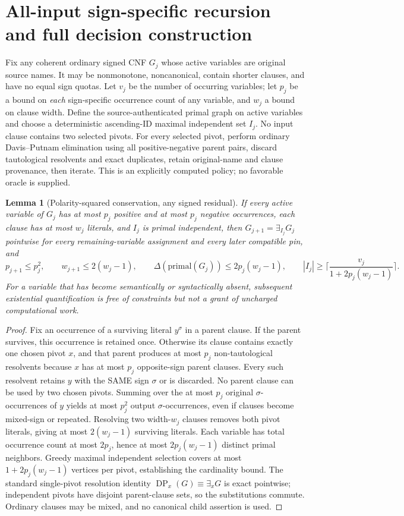 \documentclass[11pt]{article}
\newtheorem{lemma}{Lemma}
\begin{document}
\section{All-input sign-specific recursion and full decision construction}
Fix any coherent ordinary signed CNF $G_j$ whose active variables are original source names. It may be nonmonotone, noncanonical, contain shorter clauses, and have no equal sign quotas. Let $v_j$ be the number of occurring variables; let $p_j$ be a bound on \emph{each} sign-specific occurrence count of any variable, and $w_j$ a bound on clause width. Define the source-authenticated primal graph on active variables and choose a deterministic ascending-ID maximal independent set $I_j$. No input clause contains two selected pivots. For every selected pivot, perform ordinary Davis--Putnam elimination using all positive-negative parent pairs, discard tautological resolvents and exact duplicates, retain original-name and clause provenance, then iterate. This is an explicitly computed policy; no favorable oracle is supplied.

\begin{lemma}[Polarity-squared conservation, any signed residual]
If every active variable of $G_j$ has at most $p_j$ positive and at most $p_j$ negative occurrences, each clause has at most $w_j$ literals, and $I_j$ is primal independent, then $G_{j+1}=\exists_{I_j}G_j$ pointwise for \emph{every} remaining-variable assignment and every later compatible pin, and
\[
 p_{j+1}\le p_j^2,\qquad
 w_{j+1}\le2(w_j-1),\qquad
 \Delta(\mathrm{primal}(G_j))\le2p_j(w_j-1),\qquad
 |I_j|\ge\Big\lceil\frac{v_j}{1+2p_j(w_j-1)}\Big\rceil .
\]
For a variable that has become semantically or syntactically absent, subsequent existential quantification is free of constraints but not a grant of uncharged computational work.
\end{lemma}
\begin{proof}
Fix an occurrence of a surviving literal $y^\sigma$ in a parent clause. If the parent survives, this occurrence is retained once. Otherwise its clause contains exactly one chosen pivot $x$, and that parent produces at most $p_j$ non-tautological resolvents because $x$ has at most $p_j$ opposite-sign parent clauses. Every such resolvent retains $y$ with the SAME sign $\sigma$ or is discarded. No parent clause can be used by two chosen pivots. Summing over the at most $p_j$ original $\sigma$-occurrences of $y$ yields at most $p_j^2$ output $\sigma$-occurrences, even if clauses become mixed-sign or repeated. Resolving two width-$w_j$ clauses removes both pivot literals, giving at most $2(w_j-1)$ surviving literals. Each variable has total occurrence count at most $2p_j$, hence at most $2p_j(w_j-1)$ distinct primal neighbors. Greedy maximal independent selection covers at most $1+2p_j(w_j-1)$ vertices per pivot, establishing the cardinality bound. The standard single-pivot resolution identity $\operatorname{DP}_x(G)\equiv\exists_xG$ is exact pointwise; independent pivots have disjoint parent-clause sets, so the substitutions commute. Ordinary clauses may be mixed, and no canonical child assertion is used.\end{proof}
\end{document}
